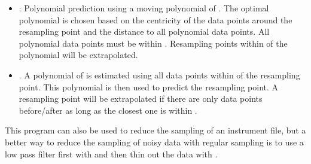 \begin{itemize}
\item {}: Polynomial prediction using a moving polynomial of .
  The optimal polynomial is chosen based on the centricity of the data points around the resampling
  point and the distance to all polynomial data points. All polynomial data points must be within
  . Resampling points within  of the
  polynomial will be extrapolated.


\item {}. A polynomial of  is estimated using
  all data points within  of the resampling point. This polynomial is then
  used to predict the resampling point. A resampling point will be extrapolated if there are only data
  points before/after as long as the closest one is within .

\end{itemize}

This program can also be used to reduce the sampling of an instrument file,
but a better way to reduce the sampling of noisy data with regular sampling
is to use a low pass filter first with  and then thin
out the data with .


